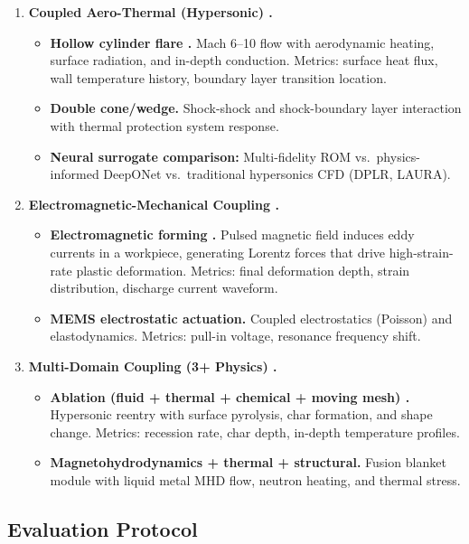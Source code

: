 \documentclass[11pt,a4paper]{article}
\theoremstyle{definition}
\begin{document}
\begin{enumerate}[label=\textbf{BM\arabic*:},leftmargin=*]
    \item \textbf{ Coupled Aero-Thermal (Hypersonic) .}
    \begin{itemize}
        \item \textbf{Hollow cylinder flare \cite{HypersonicBenchmark}.} Mach 6--10 flow with aerodynamic heating, surface radiation, and in-depth conduction. Metrics: surface heat flux, wall temperature history, boundary layer transition location.
        \item \textbf{Double cone/wedge.} Shock-shock and shock-boundary layer interaction with thermal protection system response.
        \item \textbf{Neural surrogate comparison:} Multi-fidelity ROM \cite{Hesthaven2016} vs.\ physics-informed DeepONet vs.\ traditional hypersonics CFD (DPLR, LAURA).
    \end{itemize}

    \item \textbf{ Electromagnetic-Mechanical Coupling .}
    \begin{itemize}
        \item \textbf{Electromagnetic forming \cite{EMforming}.} Pulsed magnetic field induces eddy currents in a workpiece, generating Lorentz forces that drive high-strain-rate plastic deformation. Metrics: final deformation depth, strain distribution, discharge current waveform.
        \item \textbf{MEMS electrostatic actuation.} Coupled electrostatics (Poisson) and elastodynamics. Metrics: pull-in voltage, resonance frequency shift.
    \end{itemize}

    \item \textbf{ Multi-Domain Coupling (3+ Physics) .}
    \begin{itemize}
        \item \textbf{Ablation (fluid + thermal + chemical + moving mesh) \cite{Ablation}.} Hypersonic reentry with surface pyrolysis, char formation, and shape change. Metrics: recession rate, char depth, in-depth temperature profiles.
        \item \textbf{Magnetohydrodynamics + thermal + structural.} Fusion blanket module with liquid metal MHD flow, neutron heating, and thermal stress.
    \end{itemize}

\end{enumerate}

\subsection{Evaluation Protocol}
\end{document}
